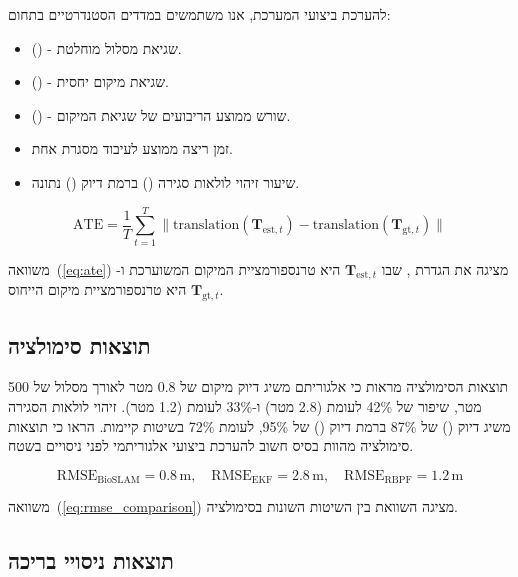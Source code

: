 להערכת ביצועי המערכת, אנו משתמשים במדדים הסטנדרטיים בתחום:

\begin{itemize}
    \item {} () - שגיאת מסלול מוחלטת.
    \item {} () - שגיאת מיקום יחסית.
    \item {} () - שורש ממוצע הריבועים של שגיאת המיקום.
    \item זמן ריצה ממוצע לעיבוד מסגרת אחת.
    \item שיעור זיהוי לולאות סגירה () ברמת דיוק () נתונה.
\end{itemize}

\begin{equation}
\text{ATE} = \frac{1}{T} \sum_{t=1}^{T} \| \text{translation}(\mathbf{T}_{\text{est}, t}) - \text{translation}(\mathbf{T}_{\text{gt}, t}) \|
\label{eq:ate}
\end{equation}

משוואה~(\ref{eq:ate}) מציגה את הגדרת , שבו $\mathbf{T}_{\text{est}, t}$ היא טרנספורמציית המיקום המשוערכת ו-$\mathbf{T}_{\text{gt}, t}$ היא טרנספורמציית מיקום הייחוס.

\subsection{תוצאות סימולציה}
\label{sec:simulation_results}

תוצאות הסימולציה מראות כי אלגוריתם  משיג דיוק מיקום של 0.8 מטר לאורך מסלול של 500 מטר, שיפור של 42\% לעומת  (2.8 מטר) ו-33\% לעומת  (1.2 מטר). זיהוי לולאות הסגירה משיג דיוק () של 87\% ברמת דיוק () של 95\%, לעומת 72\% בשיטות קיימות. \citet{Grisetti2010g2o} הראו כי תוצאות סימולציה מהוות בסיס חשוב להערכת ביצועי אלגוריתמי  לפני ניסויים בשטח.

\begin{equation}
\text{RMSE}_{\text{BioSLAM}} = 0.8 \, \text{m}, \quad \text{RMSE}_{\text{EKF}} = 2.8 \, \text{m}, \quad \text{RMSE}_{\text{RBPF}} = 1.2 \, \text{m}
\label{eq:rmse_comparison}
\end{equation}

משוואה~(\ref{eq:rmse_comparison}) מציגה השוואת  בין השיטות השונות בסימולציה.

\subsection{תוצאות ניסויי בריכה}
\label{sec:pool_results}

